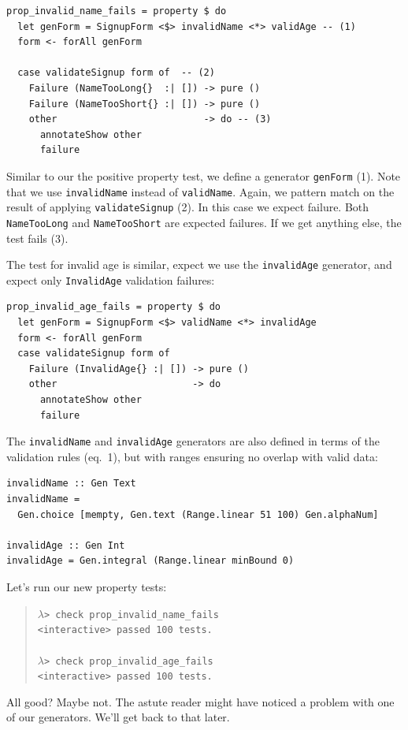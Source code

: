 \begin{verbatim}
prop_invalid_name_fails = property $ do
  let genForm = SignupForm <$> invalidName <*> validAge -- (1)
  form <- forAll genForm

  case validateSignup form of  -- (2)
    Failure (NameTooLong{}  :| []) -> pure ()
    Failure (NameTooShort{} :| []) -> pure ()
    other                          -> do -- (3)
      annotateShow other
      failure
\end{verbatim}
Similar to our the positive property test, we define a generator
\texttt{genForm} (1). Note that we use \texttt{invalidName} instead of
\texttt{validName}.
Again, we pattern match on the result of applying
\texttt{validateSignup} (2). In this case we expect failure. Both
\texttt{NameTooLong} and \texttt{NameTooShort} are expected failures. If
we get anything else, the test fails (3).

The test for invalid age is similar, expect we use the
\texttt{invalidAge} generator, and expect only \texttt{InvalidAge}
validation failures:

\begin{verbatim}
prop_invalid_age_fails = property $ do
  let genForm = SignupForm <$> validName <*> invalidAge
  form <- forAll genForm
  case validateSignup form of
    Failure (InvalidAge{} :| []) -> pure ()
    other                        -> do
      annotateShow other
      failure
\end{verbatim}
The \texttt{invalidName} and \texttt{invalidAge} generators are also
defined in terms of the validation rules (eq.~1), but with ranges
ensuring no overlap with valid data:

\begin{verbatim}
invalidName :: Gen Text
invalidName =
  Gen.choice [mempty, Gen.text (Range.linear 51 100) Gen.alphaNum]

invalidAge :: Gen Int
invalidAge = Gen.integral (Range.linear minBound 0)
\end{verbatim}
Let's run our new property tests:

\begin{quote}
$\lambda$\verb|> check prop_invalid_name_fails| \\
  \hspace*{1cm}\checkmark \verb|<interactive> passed 100 tests.| \\
  \\
$\lambda$\verb|> check prop_invalid_age_fails| \\
  \hspace*{1cm}\checkmark \verb|<interactive> passed 100 tests.|
\end{quote}
All good? Maybe not. The astute reader might have noticed a problem with
one of our generators. We'll get back to that later.

